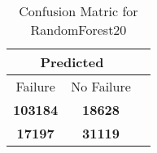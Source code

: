 \begin{table}[] 
\caption{Confusion Matric for RandomForest20} 
\label{Table: Prediction Accuracy-DMDRandomForest20OnlySunEKF-combinationReflectionEKF-top2-Reflection} 
\centering 
\begin{tabular} 
 {@{}ccc@{}} 
\toprule 
\multicolumn{2}{c}{\textbf{Predicted}}
 \\ \midrule 
\multicolumn{1}{|c|}{Failure} & 
\multicolumn{1}{c|}{No Failure}
 \\ \midrule 
\multicolumn{1}{|c|}{\color{green}\textbf{103184}} & 
\multicolumn{1}{c|}{\color{red}\textbf{18628}}
 \\ \midrule 
\multicolumn{1}{|c|}{\color{red}\textbf{17197}} & 
\multicolumn{1}{c|}{\color{green}\textbf{31119}}
 \\ \bottomrule 
\end{tabular} 
\end{table} 
